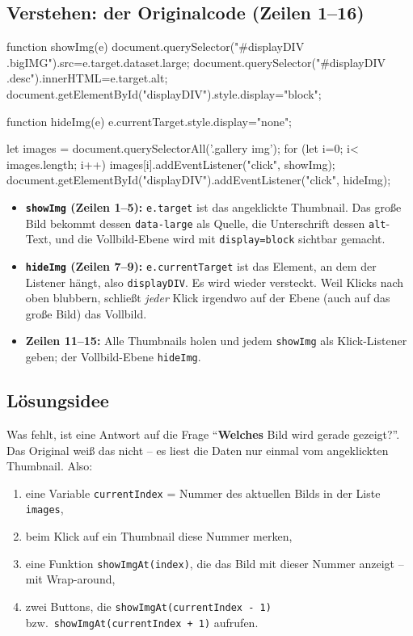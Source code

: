 \documentclass[a4paper,11pt]{article}
\begin{document}
\subsection{Verstehen: der Originalcode (Zeilen 1--16)}
\begin{code}
function showImg(e) {
   document.querySelector("#displayDIV .bigIMG").src=e.target.dataset.large;
   document.querySelector("#displayDIV .desc").innerHTML=e.target.alt;
   document.getElementById("displayDIV").style.display="block";
}

function hideImg(e) {
   e.currentTarget.style.display="none";
}

let images = document.querySelectorAll('.gallery img');
for (let i=0; i< images.length; i++) {
   images[i].addEventListener("click", showImg);
}
document.getElementById("displayDIV").addEventListener("click", hideImg);
\end{code}
\begin{itemize}
\item \textbf{\texttt{showImg} (Zeilen 1--5):} \texttt{e.target} ist das angeklickte Thumbnail. Das große Bild bekommt
      dessen \texttt{data-large} als Quelle, die Unterschrift dessen \texttt{alt}-Text, und die Vollbild-Ebene wird mit
      \texttt{display=\textquotedbl{}block\textquotedbl{}} sichtbar gemacht.
\item \textbf{\texttt{hideImg} (Zeilen 7--9):} \texttt{e.currentTarget} ist das Element, an dem der Listener hängt, also
      \texttt{displayDIV}. Es wird wieder versteckt. Weil Klicks nach oben blubbern, schließt \emph{jeder} Klick
      irgendwo auf der Ebene (auch auf das große Bild) das Vollbild.
\item \textbf{Zeilen 11--15:} Alle Thumbnails holen und jedem \texttt{showImg} als Klick-Listener geben; der
      Vollbild-Ebene \texttt{hideImg}.
\end{itemize}

\subsection{Lösungsidee}

Was fehlt, ist eine Antwort auf die Frage "`\textbf{Welches} Bild wird gerade gezeigt?"'. Das Original weiß das
nicht -- es liest die Daten nur einmal vom angeklickten Thumbnail. Also:
\begin{enumerate}[nosep]
\item eine Variable \texttt{currentIndex} = Nummer des aktuellen Bilds in der Liste \texttt{images},
\item beim Klick auf ein Thumbnail diese Nummer merken,
\item eine Funktion \texttt{showImgAt(index)}, die das Bild mit dieser Nummer anzeigt -- mit Wrap-around,
\item zwei Buttons, die \texttt{showImgAt(currentIndex - 1)} bzw.\ \texttt{showImgAt(currentIndex + 1)} aufrufen.
\end{enumerate}
\end{document}
